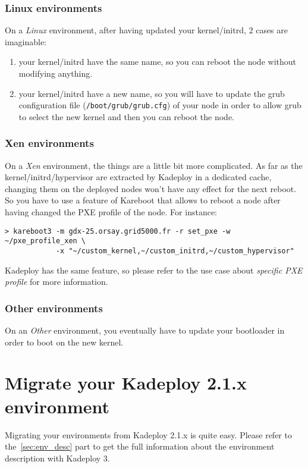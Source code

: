 \documentclass[a4wide,10pt,oneside]{book}
\begin{document}
\subsubsection{Linux environments}
On a \emph{Linux} environment, after having updated your kernel/initrd, 2 cases are imaginable:
\begin{enumerate}
\item your kernel/initrd have the same name, so you can reboot the node without modifying anything.
\item your kernel/initrd have a new name, so you will have to update the grub configuration file (\texttt{/boot/grub/grub.cfg}) of your node in order to allow grub to select the new kernel and then you can reboot the node.
\end{enumerate}

\subsubsection{Xen environments}
On a \emph{Xen} environment, the things are a little bit more complicated. As far as the kernel/initrd/hypervisor are extracted by Kadeploy in a dedicated cache, changing them on the deployed nodes won't have any effect for the next reboot. So you have to use a feature of Kareboot that allows to reboot a node after having changed the PXE profile of the node. For instance:
\begin{verbatim}
> kareboot3 -m gdx-25.orsay.grid5000.fr -r set_pxe -w ~/pxe_profile_xen \
            -x "~/custom_kernel,~/custom_initrd,~/custom_hypervisor"
\end{verbatim}
Kadeploy has the same feature, so please refer to the use case about \textit{specific PXE profile} for more information.

\subsubsection{Other environments}
On an \emph{Other} environment, you eventually have to update your bootloader in order to boot on the new kernel.

\section{Migrate your Kadeploy 2.1.x environment}
Migrating your environments from Kadeploy 2.1.x is quite easy. Please refer to the~\ref{sec:env_desc} part to get the full information about the environment description with Kadeploy 3.
\end{document}
